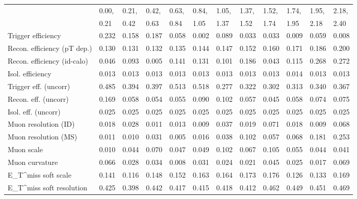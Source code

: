 \begin{tabular}{l|p{0.6cm}p{0.6cm}p{0.6cm}p{0.6cm}p{0.6cm}p{0.6cm}p{0.6cm}p{0.6cm}p{0.6cm}p{0.6cm}p{0.6cm}}
\hline
   & 0.00, & 0.21, & 0.42, & 0.63, & 0.84, & 1.05, & 1.37, & 1.52, & 1.74, & 1.95, & 2.18,  \\ 
   & 0.21 & 0.42 & 0.63 & 0.84 & 1.05 & 1.37 & 1.52 & 1.74 & 1.95 & 2.18 & 2.40  \\ 
\hline
Trigger efficiency                       & 0.232 & 0.158 & 0.187 & 0.058 & 0.002 & 0.089 & 0.033 & 0.033 & 0.009 & 0.059 & 0.008 \\
Recon. efficiency (pT dep.)              & 0.130 & 0.131 & 0.132 & 0.135 & 0.144 & 0.147 & 0.152 & 0.160 & 0.171 & 0.186 & 0.200 \\
Recon. efficiency (id-calo)              & 0.046 & 0.093 & 0.005 & 0.141 & 0.131 & 0.101 & 0.186 & 0.043 & 0.115 & 0.268 & 0.272 \\
Isol. efficiency                         & 0.013 & 0.013 & 0.013 & 0.013 & 0.013 & 0.013 & 0.013 & 0.013 & 0.014 & 0.013 & 0.013 \\
Trigger eff. (uncorr)                    & 0.485 & 0.394 & 0.397 & 0.513 & 0.518 & 0.277 & 0.322 & 0.302 & 0.313 & 0.340 & 0.367 \\
Recon. eff. (uncorr)                     & 0.169 & 0.058 & 0.054 & 0.055 & 0.090 & 0.102 & 0.057 & 0.045 & 0.058 & 0.074 & 0.075 \\
Isol. eff. (uncorr)                      & 0.025 & 0.025 & 0.025 & 0.025 & 0.025 & 0.025 & 0.025 & 0.025 & 0.025 & 0.025 & 0.025 \\
Muon resolution (ID)                     & 0.018 & 0.028 & 0.011 & 0.013 & 0.009 & 0.037 & 0.019 & 0.071 & 0.018 & 0.009 & 0.068 \\
Muon resolution (MS)                     & 0.011 & 0.010 & 0.031 & 0.005 & 0.016 & 0.038 & 0.102 & 0.057 & 0.068 & 0.181 & 0.253 \\
Muon scale                               & 0.010 & 0.044 & 0.070 & 0.047 & 0.049 & 0.102 & 0.067 & 0.105 & 0.055 & 0.044 & 0.041 \\
Muon curvature                           & 0.066 & 0.028 & 0.034 & 0.008 & 0.031 & 0.024 & 0.021 & 0.045 & 0.025 & 0.017 & 0.069 \\
E_{T}^{miss} soft scale                  & 0.141 & 0.116 & 0.148 & 0.152 & 0.163 & 0.164 & 0.173 & 0.176 & 0.126 & 0.133 & 0.169 \\
E_{T}^{miss} soft resolution             & 0.425 & 0.398 & 0.442 & 0.417 & 0.415 & 0.418 & 0.412 & 0.462 & 0.449 & 0.451 & 0.469 \\

\end{tabular}
